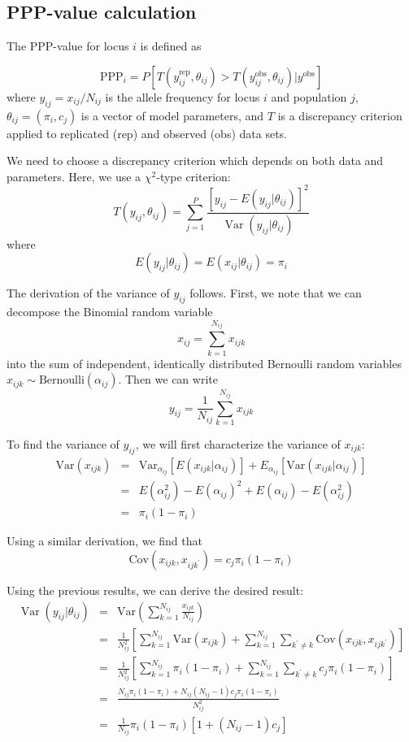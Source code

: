 \documentclass[a4paper,12pt]{article}
\begin{document}
\subsection{PPP-value calculation}

The PPP-value for locus $i$ is defined as

$$\text{PPP}_i = 
P\left[T(y_{ij}^{\text{rep}},\theta_{ij})>
       T(y_{ij}^{\text{obs}},\theta_{ij})|y^{\text{obs}}\right]
$$
where $y_{ij}=x_{ij}/N_{ij}$ is the allele frequency for locus $i$ and
population $j$, $\theta_{ij}=(\pi_i,c_j)$ is a vector of model
parameters, and $T$ is a discrepancy criterion applied to replicated
(rep) and observed (obs) data sets.

We need to choose a discrepancy criterion which depends on both data
and parameters. Here, we use a $\chi^2$-type criterion:
$$T(y_{ij},\theta_{ij}) = \sum_{j=1}^P 
\frac{\left[y_{ij} - E(y_{ij}|\theta_{ij})\right]^2}{
  \operatorname{Var}(y_{ij}|\theta_{ij})}
$$
where
$$
E(y_{ij}|\theta_{ij}) = 
E(x_{ij}|\theta_{ij}) = \pi_i
$$

The derivation of the variance of $y_{ij}$ follows. First, we note that we can decompose the Binomial random variable
$$
x_{ij}=\sum_{k=1}^{N_{ij}} x_{ijk}
$$
into the sum of independent, identically distributed Bernoulli random
variables $x_{ijk}\sim \text{Bernoulli}(\alpha_{ij})$. Then we can write
$$
y_{ij} = \frac 1 {N_{ij}} \sum_{k=1}^{N_{ij}} x_{ijk}
$$

To find the variance of $y_{ij}$, we will first characterize the
variance of $x_{ijk}$:
\newcommand{\Var}{\text{Var}}
\newcommand{\Cov}{\text{Cov}}
\begin{eqnarray*}
  \text{Var}(x_{ijk}) &=&
  \Var_{\alpha_{ij}} \left[ E(x_{ijk}|\alpha_{ij}) \right] +
  E_{\alpha_{ij}} \left[ \Var(x_{ijk}|\alpha_{ij}) \right] \\
  &=&
  E(\alpha_{ij}^2)-E(\alpha_{ij})^2+
  E(\alpha_{ij})-E(\alpha_{ij}^2)\\
  &=&\pi_i(1-\pi_i)
\end{eqnarray*}

Using a similar derivation, we find that
$$
\Cov(x_{ijk},x_{ijk^\prime}) = c_j \pi_i(1-\pi_i)
$$

Using the previous results, we can derive the desired result:
\begin{eqnarray*}
  \operatorname{Var}(y_{ij}|\theta_{ij}) &=&
  \Var\left(\sum_{k=1}^{N_{ij}} \frac{x_{ijk}}{N_{ij}} \right)\\
  &=&
  \frac{ 1 }{N_{ij}^2}\left[
    \sum_{k=1}^{N_{ij}} \Var(x_{ijk}) +
    \sum_{k=1}^{N_{ij}} \sum_{k^\prime \neq k} \Cov(x_{ijk},x_{ijk^\prime}) 
\right]\\
  &=&
  \frac{ 1 }{N_{ij}^2}\left[
    \sum_{k=1}^{N_{ij}} \pi_i(1-\pi_i) +
    \sum_{k=1}^{N_{ij}} \sum_{k^\prime \neq k} c_j\pi_i(1-\pi_i) 
\right]\\
  &=&
  \frac{
    N_{ij} \pi_i(1-\pi_i) +
    N_{ij}(N_{ij}-1) c_j\pi_i(1-\pi_i) 
  }{N_{ij}^2}\\
  &=&
  \frac 1 {N_{ij}} \pi_i(1-\pi_i)
  \left[1+(N_{ij}-1)c_j\right]
\end{eqnarray*}
\newcommand{\Bin}{\operatorname{Bin}}
\end{document}
